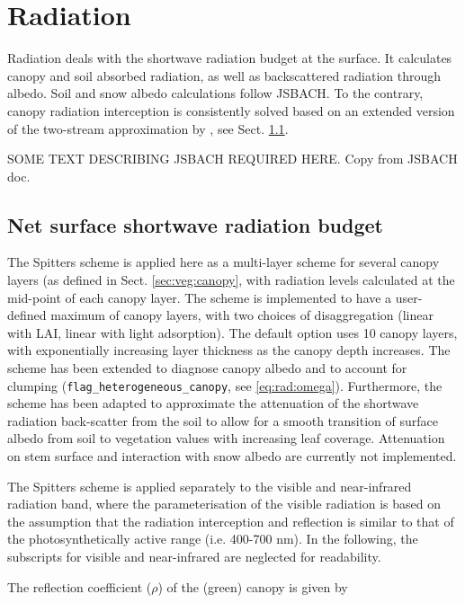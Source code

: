 \chapter{Radiation}\label{ch:rad}

Radiation deals with the shortwave radiation budget at the surface. It calculates canopy and soil absorbed radiation, as well as backscattered radiation through albedo. Soil and snow albedo calculations follow JSBACH. To the contrary, canopy radiation interception is consistently solved based on an extended version of the two-stream approximation by \cite{Spitters:1986tv}, see Sect. \ref{sec:rad:vegetation}.

SOME TEXT DESCRIBING JSBACH REQUIRED HERE. Copy from JSBACH doc.

\section{Net surface shortwave radiation budget}\label{sec:rad:vegetation}

The Spitters scheme is applied here as a multi-layer scheme for several canopy layers (as defined in Sect. \ref{sec:veg:canopy}, with radiation levels calculated at the mid-point of each canopy layer. The scheme is implemented to have a user-defined maximum of canopy layers, with two choices of disaggregation (linear with LAI, linear with light adsorption). The default option uses 10 canopy layers, with exponentially increasing layer thickness as the canopy depth increases. The scheme has been extended to diagnose canopy albedo and to account for clumping (\texttt{flag\_heterogeneous\_canopy}, see \ref{eq:rad:omega}). Furthermore, the scheme has been adapted to approximate the attenuation of the shortwave radiation back-scatter from the soil to allow for a smooth transition of surface albedo from soil to vegetation values with increasing leaf coverage. Attenuation on stem surface and interaction with snow albedo are currently not implemented.

The Spitters scheme is applied separately to the visible and near-infrared radiation band, where the parameterisation of the visible radiation is based on the assumption that the radiation interception and reflection is similar to that of the photosynthetically active range (i.e. 400-700 nm). In the following, the subscripts for visible and near-infrared are neglected for readability.

The reflection coefficient ($\rho$) of the (green) canopy is given by

